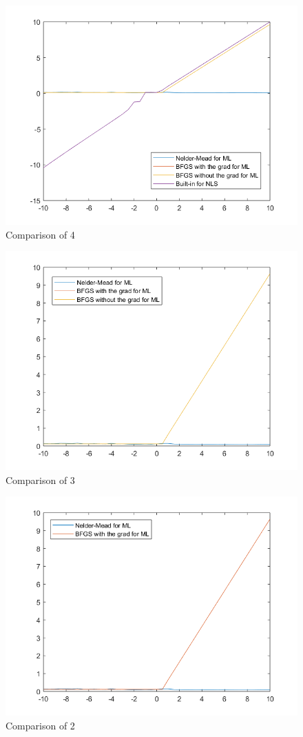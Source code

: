 \documentclass[11pt]{article}
\begin{document}
\begin{figure}
\includegraphics{4.png}
\caption{Comparison of 4}
\end{figure}
\begin{figure}
\includegraphics{3.png}
\caption{Comparison of 3}
\end{figure}
\begin{figure}
\includegraphics{2.png}
\caption{Comparison of 2}
\end{figure}
\end{document}
